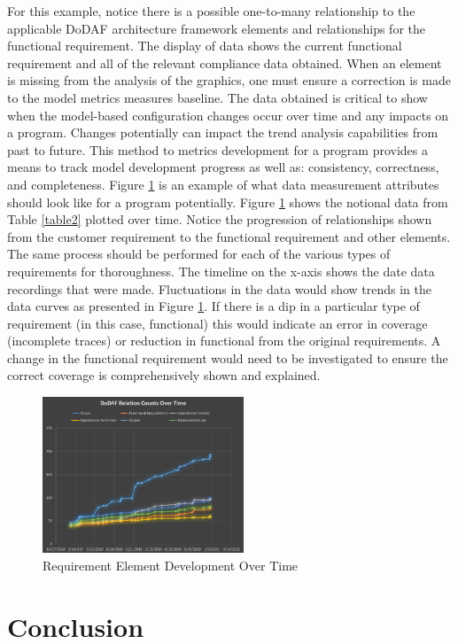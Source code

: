 \documentclass[num-refs]{wiley-article}
\begin{document}
For this example, notice there is a possible one-to-many relationship to the applicable DoDAF architecture framework elements and relationships for the functional requirement. The display of data shows the current functional requirement and all of the relevant compliance data obtained. When an element is missing from the analysis of the graphics, one must ensure a correction is made to the model metrics measures baseline. The data obtained is critical to show when the model-based configuration changes occur over time and any impacts on a program. Changes potentially can impact the trend analysis capabilities from past to future. This method to metrics development for a program provides a means to track model development progress as well as: consistency, correctness, and completeness. Figure \ref{fig8} is an example of what data measurement attributes should look like for a program potentially. Figure \ref{fig8} shows the notional data from Table \ref{table2} plotted over time. Notice the progression of relationships shown from the customer requirement to the functional requirement and other elements. The same process should be performed for each of the various types of requirements for thoroughness. The timeline on the x-axis shows the date data recordings that were made. Fluctuations in the data would show trends in the data curves as presented in Figure \ref{fig8}. If there is a dip in a particular type of requirement (in this case, functional) this would indicate an error in coverage (incomplete traces) or reduction in functional from the original requirements. A change in the functional requirement would need to be investigated to ensure the correct coverage is comprehensively shown and explained.

\begin{figure}
\centering
\includegraphics[width=6cm]{Images/graph.png}
\caption{Requirement Element Development Over Time}
\label{fig8}
\end{figure}

\section{Conclusion}
\end{document}
